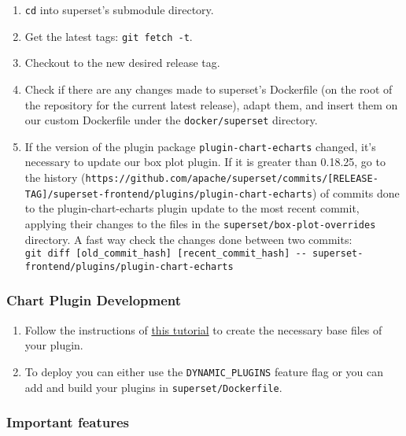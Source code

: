 \documentclass[
]{book}
\begin{document}
\begin{enumerate}
\def\labelenumi{\arabic{enumi}.}
\item
  \texttt{cd} into superset's submodule directory.
\item
  Get the latest tags: \texttt{git\ fetch\ -t}.
\item
  Checkout to the new desired release tag.
\item
  Check if there are any changes made to superset's Dockerfile (on the root of the repository for the current latest release), adapt them, and insert them on our custom Dockerfile under the \texttt{docker/superset} directory.
\item
  If the version of the plugin package \texttt{plugin-chart-echarts} changed, it's necessary to update our box plot plugin. If it is greater than 0.18.25, go to the history (\texttt{https://github.com/apache/superset/commits/{[}RELEASE-TAG{]}/superset-frontend/plugins/plugin-chart-echarts}) of commits done to the plugin-chart-echarts plugin update to the most recent commit, applying their changes to the files in the \texttt{superset/box-plot-overrides} directory. A fast way check the changes done between two commits: \texttt{git\ diff\ {[}old\_commit\_hash{]}\ {[}recent\_commit\_hash{]}\ -\/-\ superset-frontend/plugins/plugin-chart-echarts}
\end{enumerate}

\hypertarget{chart-plugin-development}{%
\subsubsection*{Chart Plugin Development}\label{chart-plugin-development}}

\begin{enumerate}
\def\labelenumi{\arabic{enumi}.}
\item
  Follow the instructions of \href{https://superset.apache.org/docs/contributing/creating-viz-plugins}{this tutorial} to create the necessary base files of your plugin.
\item
  To deploy you can either use the \texttt{DYNAMIC\_PLUGINS} feature flag or you can add and build your plugins in \texttt{superset/Dockerfile}.
\end{enumerate}

\hypertarget{important-features}{%
\subsubsection*{Important features}\label{important-features}}
\end{document}
